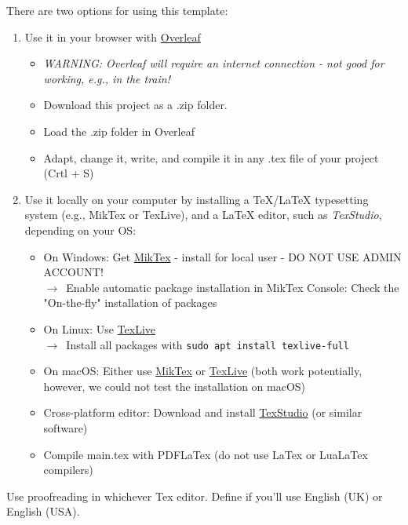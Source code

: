 \documentclass[12pt,oneside]{article}
\begin{document}
	There are two options for using this template:
	\begin{enumerate}
		\item Use it in your browser with \href{https://www.overleaf.com/}{Overleaf}
			\begin{itemize}
				\item[] \textit{WARNING: Overleaf will require an internet connection - not good for working, e.g., in the train!}
				\item Download this project as a .zip folder.
				\item Load the .zip folder in Overleaf
				\item Adapt, change it, write, and compile it in any .tex file of your project (Crtl + S)
			\end{itemize}
		\item Use it locally on your computer by installing a TeX/LaTeX typesetting system (e.g., MikTex or TexLive), and a LaTeX editor, such as \textit{TexStudio}, depending on your OS:
			\begin{itemize}
				\item On Windows: Get \href{https://miktex.org/howto/install-miktex}{MikTex} - install for local user - DO NOT USE ADMIN ACCOUNT!
				\\ $\rightarrow$~Enable automatic package installation in MikTex Console: Check the "On-the-fly" installation of packages
				\item On Linux: Use \href{https://en.wikipedia.org/wiki/TeX_Live}{TexLive}\\ $\rightarrow$~Install all packages with \texttt{sudo apt install texlive-full}
				\item On macOS: Either use \href{https://miktex.org/howto/install-miktex}{MikTex} or \href{https://en.wikipedia.org/wiki/TeX_Live}{TexLive} (both work potentially, however, we could not test the installation on macOS)
				\item Cross-platform editor: Download and install \href{https://www.texstudio.org/}{TexStudio} (or similar software)
				\item Compile main.tex with PDFLaTex (do not use LaTex or LuaLaTex compilers)
			\end{itemize} 
	\end{enumerate}

	 Use proofreading in whichever Tex editor. Define if you'll use English (UK) or English (USA).
\end{document}
